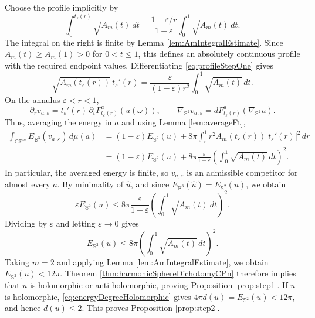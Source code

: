 \documentclass[11pt]{article}
\theoremstyle{plain}
\numberwithin{equation}{section}
\theoremstyle{definition}
\let\oldendproof\endproof
\renewenvironment{proof}[1][\proofname]{%
\oldproof[\upshape \bfseries #1]%
}{\oldendproof}
\def \mb{\mathbb}
\DeclareMathOperator{\CP}{\mathbb{CP}}
\begin{document}
\begin{proof}[Proof of Propositions \ref{prop:step1} and \ref{prop:step2}]
Choose the profile implicitly by
\begin{equation}
    \label{eq:profileStepOne}
    \int_0^{t_\varepsilon(r)}\sqrt{A_m(t)}\,dt
    =\frac{1-\varepsilon/r}{1-\varepsilon}
    \int_0^1\sqrt{A_m(t)}\,dt.
\end{equation}
The integral on the right is finite by Lemma \ref{lem:AmIntegralEstimate}.
Since $A_m(t)\geq A_m(1)>0$ for $0<t\leq1$, this defines an absolutely
continuous profile with the required endpoint values.  Differentiating
\eqref{eq:profileStepOne} gives
\[
    \sqrt{A_m(t_\varepsilon(r))}\,t_\varepsilon'(r)
    =\frac{\varepsilon}{(1-\varepsilon)r^2}
    \int_0^1\sqrt{A_m(t)}\,dt.
\]
On the annulus $\varepsilon<r<1$,
\[
    \partial_r v_{a,\varepsilon}
    =t_\varepsilon'(r)\,
    \partial_tF_{t_\varepsilon(r)}^a(u(\omega)),
    \qquad
    \nabla_{\mb S^2}v_{a,\varepsilon}
    =dF_{t_\varepsilon(r)}^a(\nabla_{\mb S^2}u).
\]
Thus, averaging the energy in $a$ and using Lemma \ref{lem:averageFt},
\[
\begin{aligned}
    \int_{\CP^m}E_{\mb B^3}(v_{a,\varepsilon})\,d\mu(a)
    &=(1-\varepsilon)E_{\mb S^2}(u)
      +8\pi\int_\varepsilon^1
      r^2A_m(t_\varepsilon(r))|t_\varepsilon'(r)|^2\,dr\\
    &=(1-\varepsilon)E_{\mb S^2}(u)
      +8\pi\frac{\varepsilon}{1-\varepsilon}
      \left(\int_0^1\sqrt{A_m(t)}\,dt\right)^2.
\end{aligned}
\]
In particular, the averaged energy is finite, so $v_{a,\varepsilon}$ is
an admissible competitor for almost every $a$.  By minimality of
$\hat u$, and since $E_{\mb B^3}(\hat u)=E_{\mb S^2}(u)$, we obtain
\begin{equation}
    \label{eq:oneDimensionalStepTwo}
    \varepsilon E_{\mb S^2}(u)
    \leq 8\pi\frac{\varepsilon}{1-\varepsilon}
    \left(\int_0^1\sqrt{A_m(t)}\,dt\right)^2.
\end{equation}
Dividing by $\varepsilon$ and letting $\varepsilon\to0$ gives
\begin{equation}
    \label{eq:upperEnergyCPn}
    E_{\mb S^2}(u)
    \leq8\pi\left(\int_0^1\sqrt{A_m(t)}\,dt\right)^2.
\end{equation}
Taking $m=2$ and applying Lemma \ref{lem:AmIntegralEstimate}, we obtain
$E_{\mb S^2}(u)<12\pi$.  Theorem
\ref{thm:harmonicSphereDichotomyCPn} therefore implies that $u$ is
holomorphic or anti-holomorphic, proving Proposition \ref{prop:step1}.
If $u$ is holomorphic, \eqref{eq:energyDegreeHolomorphic} gives
$4\pi d(u)=E_{\mb S^2}(u)<12\pi$, and hence $d(u)\leq2$.
This proves Proposition \ref{prop:step2}.
\end{proof}
\end{document}

